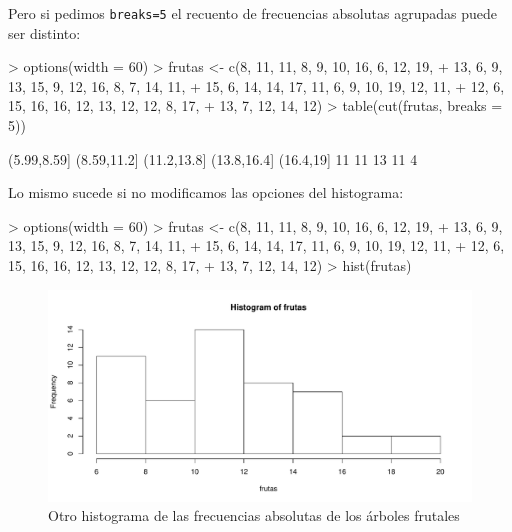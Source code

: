\begin{frame}[fragile]
Pero si pedimos \texttt{breaks=5}  el recuento de frecuencias absolutas agrupadas puede ser distinto:
\begin{Schunk}
\begin{Sinput}
> options(width = 60)
> frutas <- c(8, 11, 11, 8, 9, 10, 16, 6, 12, 19, 
+     13, 6, 9, 13, 15, 9, 12, 16, 8, 7, 14, 11, 
+     15, 6, 14, 14, 17, 11, 6, 9, 10, 19, 12, 11, 
+     12, 6, 15, 16, 16, 12, 13, 12, 12, 8, 17, 
+     13, 7, 12, 14, 12)
> table(cut(frutas, breaks = 5))
\end{Sinput}
\begin{Soutput}
(5.99,8.59] (8.59,11.2] (11.2,13.8] (13.8,16.4]   (16.4,19] 
         11          11          13          11           4 
\end{Soutput}
\end{Schunk}
\end{frame}

\begin{frame}[fragile]
Lo mismo sucede si no modificamos las opciones del histograma:
\begin{Schunk}
\begin{Sinput}
> options(width = 60)
> frutas <- c(8, 11, 11, 8, 9, 10, 16, 6, 12, 19, 
+     13, 6, 9, 13, 15, 9, 12, 16, 8, 7, 14, 11, 
+     15, 6, 14, 14, 17, 11, 6, 9, 10, 19, 12, 11, 
+     12, 6, 15, 16, 16, 12, 13, 12, 12, 8, 17, 
+     13, 7, 12, 14, 12)
> hist(frutas)
\end{Sinput}
\end{Schunk}

\end{frame}



\begin{frame}[fragile]
\begin{figure}
\includegraphics{./dibujos/01/-011}
\caption{Otro histograma de las frecuencias absolutas de los árboles frutales}
\end{figure}
\end{frame}

